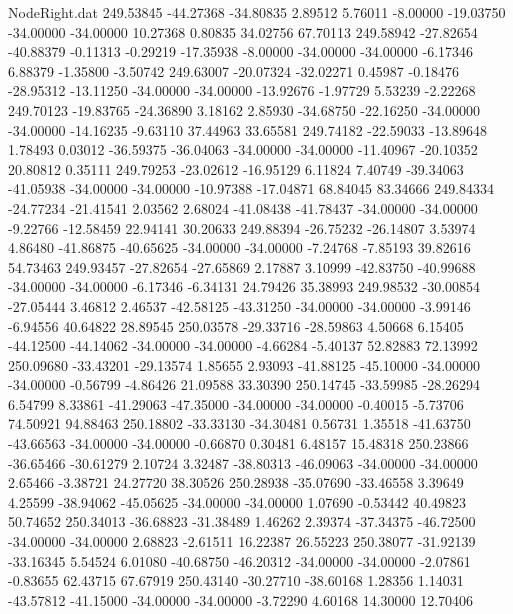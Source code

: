 \begin{filecontents}{NodeRight.dat}
 249.53845  -44.27368  -34.80835     2.89512    5.76011   -8.00000  -19.03750  -34.00000  -34.00000   10.27368    0.80835   34.02756   67.70113
 249.58942  -27.82654  -40.88379    -0.11313   -0.29219  -17.35938   -8.00000  -34.00000  -34.00000   -6.17346    6.88379   -1.35800   -3.50742
 249.63007  -20.07324  -32.02271     0.45987   -0.18476  -28.95312  -13.11250  -34.00000  -34.00000  -13.92676   -1.97729    5.53239   -2.22268
 249.70123  -19.83765  -24.36890     3.18162    2.85930  -34.68750  -22.16250  -34.00000  -34.00000  -14.16235   -9.63110   37.44963   33.65581
 249.74182  -22.59033  -13.89648     1.78493    0.03012  -36.59375  -36.04063  -34.00000  -34.00000  -11.40967  -20.10352   20.80812    0.35111
 249.79253  -23.02612  -16.95129     6.11824    7.40749  -39.34063  -41.05938  -34.00000  -34.00000  -10.97388  -17.04871   68.84045   83.34666
 249.84334  -24.77234  -21.41541     2.03562    2.68024  -41.08438  -41.78437  -34.00000  -34.00000   -9.22766  -12.58459   22.94141   30.20633
 249.88394  -26.75232  -26.14807     3.53974    4.86480  -41.86875  -40.65625  -34.00000  -34.00000   -7.24768   -7.85193   39.82616   54.73463
 249.93457  -27.82654  -27.65869     2.17887    3.10999  -42.83750  -40.99688  -34.00000  -34.00000   -6.17346   -6.34131   24.79426   35.38993
 249.98532  -30.00854  -27.05444     3.46812    2.46537  -42.58125  -43.31250  -34.00000  -34.00000   -3.99146   -6.94556   40.64822   28.89545
 250.03578  -29.33716  -28.59863     4.50668    6.15405  -44.12500  -44.14062  -34.00000  -34.00000   -4.66284   -5.40137   52.82883   72.13992
 250.09680  -33.43201  -29.13574     1.85655    2.93093  -41.88125  -45.10000  -34.00000  -34.00000   -0.56799   -4.86426   21.09588   33.30390
 250.14745  -33.59985  -28.26294     6.54799    8.33861  -41.29063  -47.35000  -34.00000  -34.00000   -0.40015   -5.73706   74.50921   94.88463
 250.18802  -33.33130  -34.30481     0.56731    1.35518  -41.63750  -43.66563  -34.00000  -34.00000   -0.66870    0.30481    6.48157   15.48318
 250.23866  -36.65466  -30.61279     2.10724    3.32487  -38.80313  -46.09063  -34.00000  -34.00000    2.65466   -3.38721   24.27720   38.30526
 250.28938  -35.07690  -33.46558     3.39649    4.25599  -38.94062  -45.05625  -34.00000  -34.00000    1.07690   -0.53442   40.49823   50.74652
 250.34013  -36.68823  -31.38489     1.46262    2.39374  -37.34375  -46.72500  -34.00000  -34.00000    2.68823   -2.61511   16.22387   26.55223
 250.38077  -31.92139  -33.16345     5.54524    6.01080  -40.68750  -46.20312  -34.00000  -34.00000   -2.07861   -0.83655   62.43715   67.67919
 250.43140  -30.27710  -38.60168     1.28356    1.14031  -43.57812  -41.15000  -34.00000  -34.00000   -3.72290    4.60168   14.30000   12.70406

\end{filecontents}
